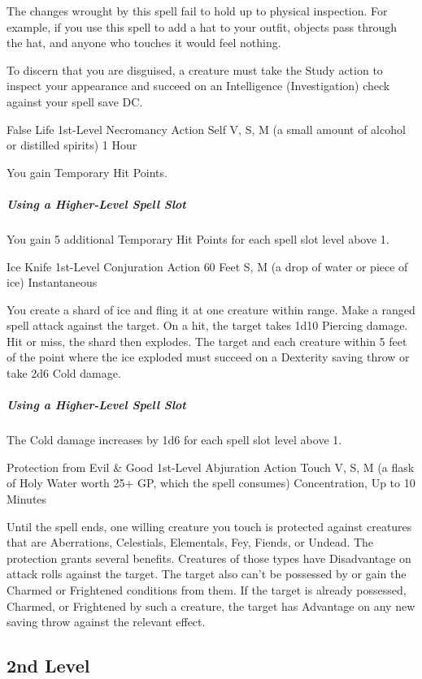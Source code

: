 \documentclass[letterpaper,openany,oneside,twocolumn]{book}
\begin{document}
The changes wrought by this spell fail to hold up to physical inspection. For example, if you use this spell to add a hat to your outfit, objects pass through the hat, and anyone who touches it would feel nothing.

To discern that you are disguised, a creature must take the Study action to inspect your appearance and succeed on an Intelligence (Investigation) check against your spell save DC.

\DndSpellHeader
  {False Life}
  {1st-Level Necromancy}
  {Action}
  {Self}
  {V, S, M (a small amount of alcohol or distilled spirits)}
  {1 Hour}

You gain  Temporary Hit Points.

\subparagraph*{Using a Higher-Level Spell Slot} You gain 5 additional Temporary Hit Points for each spell slot level above 1.

\DndSpellHeader
  {Ice Knife}
  {1st-Level Conjuration}
  {Action}
  {60 Feet}
  {S, M (a drop of water or piece of ice)}
  {Instantaneous}

You create a shard of ice and fling it at one creature within range. Make a ranged spell attack against the target. On a hit, the target takes 1d10 Piercing damage. Hit or miss, the shard then explodes. The target and each creature within 5 feet of the point where the ice exploded must succeed on a Dexterity saving throw or take 2d6 Cold damage.

\subparagraph*{Using a Higher-Level Spell Slot} The Cold damage increases by 1d6 for each spell slot level above 1.

\DndSpellHeader
  {Protection from Evil \& Good}
  {1st-Level Abjuration}
  {Action}
  {Touch}
  {V, S, M (a flask of Holy Water worth 25+ GP, which the spell consumes)}
  {Concentration, Up to 10 Minutes}

Until the spell ends, one willing creature you touch is protected against creatures that are Aberrations, Celestials, Elementals, Fey, Fiends, or Undead. The protection grants several benefits. Creatures of those types have Disadvantage on attack rolls against the target. The target also can't be possessed by or gain the Charmed or Frightened conditions from them. If the target is already possessed, Charmed, or Frightened by such a creature, the target has Advantage on any new saving throw against the relevant effect.

\subsection*{2nd Level}
\end{document}
